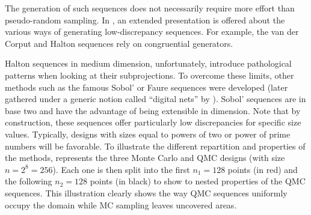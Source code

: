 
The generation of such sequences does not necessarily require more effort than pseudo-random sampling. 
In \citet[Chap. 15]{owen_2013}, an extended presentation is offered about the various ways of generating low-discrepancy sequences. 
For example, the van der Corput and Halton sequences rely on congruential generators. 

Halton sequences in medium dimension, unfortunately, introduce pathological patterns when looking at their subprojections. 
To overcome these limits, other methods such as the famous Sobol' or Faure sequences were developed (later gathered under a generic notion called ``digital nets'' by \citealp{dick_2010_digital_nets}).  
Sobol' sequences are in base two and have the advantage of being extensible in dimension. 
Note that by construction, these sequences offer particularly low discrepancies for specific size values. 
Typically, designs with sizes equal to powers of two or power of prime numbers will be favorable. 
To illustrate the different repartition and properties of the methods,  represents the three Monte Carlo and QMC designs (with size $n=2^8=256$). 
Each one is then split into the first $n_1=128$ points (in red) and the following $n_2=128$ points (in black) to show to nested properties of the QMC sequences. 
This illustration clearly shows the way QMC sequences uniformly occupy the domain while MC sampling leaves uncovered areas.  

